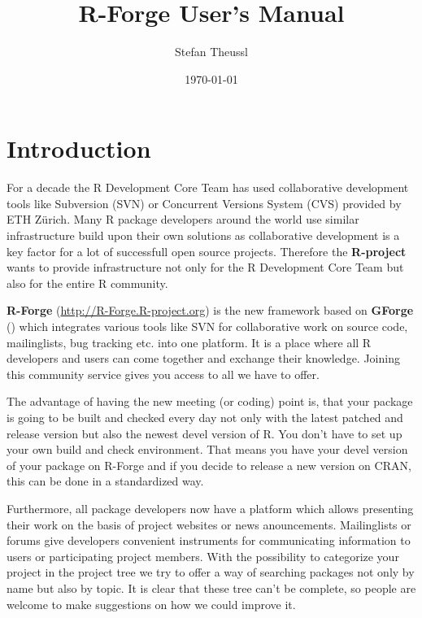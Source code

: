 \documentclass[a4paper]{article}
\title{R-Forge User's Manual}
\author{Stefan Theussl}
\date{\today}
\begin{document}
\maketitle


\section{Introduction}
\label{sec:intro}
For a decade the R Development Core Team has used collaborative
development tools like Subversion (SVN) or Concurrent Versions System
(CVS) provided by ETH Z\"urich.  
Many R package
developers around the world use similar infrastructure build upon their own
solutions as collaborative development is a key factor for a lot of
successfull open source projects. Therefore the \textbf{R-project}
wants to provide infrastructure not only
for the R Development Core Team but also for the entire R community.

\textbf{R-Forge} (\url{http://R-Forge.R-project.org}) is the new
framework based on 
\textbf{GForge} (\cite{manual:gforge}) which integrates various tools like
SVN for collaborative work on source code, mailinglists, bug tracking
etc. into one platform. It is a
place where all R developers and users can come together and exchange
their knowledge. Joining this community service gives you access to
all we have to offer.

The advantage of having the new meeting (or coding) 
point is, that your package is going to be built and checked every day
not only with the latest patched and release version but also the
newest devel version of R. You don't have to set up your own
build and check environment. That means you have your devel version of
your package on R-Forge and if you decide to release a new
version on CRAN, this can be done in a standardized way.

Furthermore, all package developers now have a
platform which allows presenting their work on the basis of project
websites or
news anouncements. Mailinglists or forums give developers convenient
instruments for communicating information to users or participating
project members.
With the possibility to categorize your project in the project tree we
try to offer a way of searching packages not only by name but also by
topic. It is clear that these tree can't be complete, so people are
welcome to make suggestions on how we could improve it.
 
\end{document}

